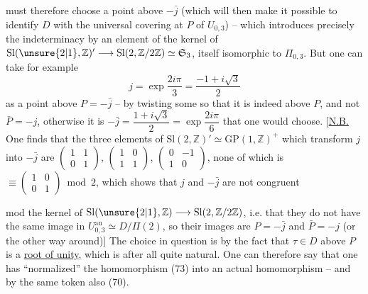 must therefore choose a point  above
$-\bar j$ (which will then make it possible to identify
$D$ with the universal covering  at $P$ of
$U_{0,3}$) -- which introduces precisely
the indeterminacy by an element of the
kernel of $\mathrm{Sl}(\unsure{2|1},\mathbb Z)'\longrightarrow
\mathrm{Sl}(2,\mathbb Z/2\mathbb Z)\simeq\mathfrak S_3$,
itself isomorphic to $\Pi_{0,3}$. But
one can take for example
\[
\tag{77}
j=\exp\frac{2i\pi}{3}=\frac{-1+i\sqrt{3}}{2}
\]
as a  point above
$P=-\bar j$ -- by twisting some  so
that it is indeed above $P$, and not
$\bar P=-j$, otherwise it is $-\bar j=\dfrac{1+i\sqrt{3}}{2}=\exp\dfrac{2i\pi}{6}$
that one would choose. [\uline{N.B.} One finds that
the three elements of $\mathrm{Sl}(2,\mathbb Z)'\simeq\mathrm{GP}(1,\mathbb Z)^+$
which transform $j$ into $-\bar j$ are
$\begin{pmatrix}1&1\\0&1\end{pmatrix}$,
$\begin{pmatrix}1&0\\1&1\end{pmatrix}$,
$\begin{pmatrix}0&-1\\1&0\end{pmatrix}$, none of which
is $\equiv\begin{pmatrix}1&0\\0&1\end{pmatrix}\bmod 2$, which shows that
$j$ and $-\bar j$  are not congruent

mod the kernel  of
$\mathrm{Sl}(\unsure{2|1},\mathbb Z)\longrightarrow\mathrm{Sl}(2,\mathbb Z/2\mathbb Z)$,
i.e. that they do not have the same image in $U_{0,3}^{\mathrm{an}}
\simeq D/\Pi(2)$, so their images are
$P=-\bar j$ and $\bar P=-j$ (or the other way around)] The
choice in question is  
by the fact that $\tau\in D$ above
$P$ is  a \uline{root of unity}, which
is after all quite natural. One can
therefore say that one has ``normalized'' the
 homomorphism (73) into an actual homomorphism -- and by
the same token also (70).



